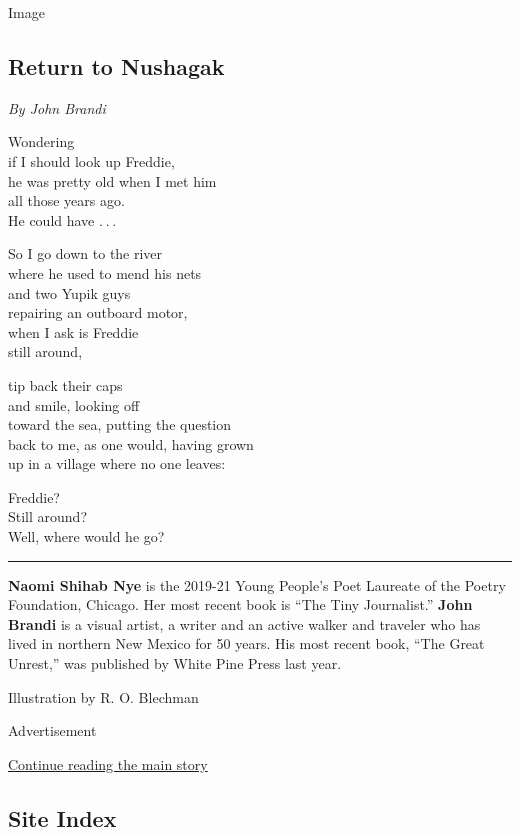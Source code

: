 Image

\hypertarget{return-to-nushagak}{%
\subsection{Return to Nushagak}\label{return-to-nushagak}}

\emph{By John Brandi}

Wondering\\
if I should look up Freddie,\\
he was pretty old when I met him\\
all those years ago.\\
He could have . . .

So I go down to the river\\
where he used to mend his nets\\
and two Yupik guys\\
repairing an outboard motor,\\
when I ask is Freddie\\
still around,

tip back their caps\\
and smile, looking off\\
toward the sea, putting the question\\
back to me, as one would, having grown\\
up in a village where no one leaves:

Freddie?\\
Still around?\\
Well, where would he go?

\begin{center}\rule{0.5\linewidth}{\linethickness}\end{center}

\textbf{Naomi Shihab Nye} is the 2019-21 Young People's Poet Laureate of
the Poetry Foundation, Chicago. Her most recent book is ``The Tiny
Journalist.'' \textbf{John Brandi} is a visual artist, a writer and an
active walker and traveler who has lived in northern New Mexico for 50
years. His most recent book, ``The Great Unrest,'' was published by
White Pine Press last year.

Illustration by R. O. Blechman

Advertisement

\protect\hyperlink{after-bottom}{Continue reading the main story}

\hypertarget{site-index}{%
\subsection{Site Index}\label{site-index}}

